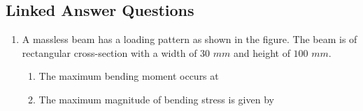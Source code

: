 \documentclass[journal,12pt,onecolumn]{IEEEtran}
\theoremstyle{remark}
\begin{document}
\subsection*{Linked Answer Questions}
\begin{enumerate}
\item A massless beam has a loading pattern as shown in the figure. The beam is of rectangular cross-section with a width of $30$ $mm$ and height of $100$ $mm$.
\\\begin{center}
   \scalebox{0.5}{}
\end{center}

\begin{enumerate}
\item The maximum bending moment occurs at
\begin{enumerate}[label=(\alph*)]
\end{enumerate}

\item The maximum magnitude of bending stress  is given by
\begin{enumerate}[label=(\alph*)]
\end{enumerate}
\end{enumerate}
\end{enumerate}
\end{document}
